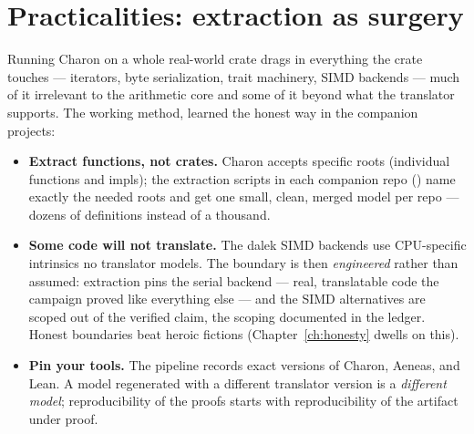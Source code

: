 \section{Practicalities: extraction as surgery}

Running Charon on a whole real-world crate drags in everything the crate
touches --- iterators, byte serialization, trait machinery, SIMD backends
--- much of it irrelevant to the arithmetic core and some of it beyond what
the translator supports. The working method, learned the honest way in the
companion projects:

\begin{itemize}[leftmargin=1.4em]
\item \textbf{Extract functions, not crates.} Charon accepts specific roots
  (individual functions and impls); the extraction scripts in each companion
  repo () name exactly the needed roots and get one
  small, clean, merged model per repo --- dozens of definitions instead
  of a thousand.
\item \textbf{Some code will not translate.} The dalek SIMD backends use
  CPU-specific intrinsics no translator models. The boundary is then
  \emph{engineered} rather than assumed: extraction pins the serial
  backend --- real, translatable code the campaign proved like everything
  else --- and the SIMD alternatives are scoped out of the verified
  claim, the scoping documented in the ledger. Honest boundaries beat
  heroic fictions (Chapter~\ref{ch:honesty} dwells on this).
\item \textbf{Pin your tools.} The pipeline records exact versions of
  Charon, Aeneas, and Lean. A model regenerated with a different translator
  version is a \emph{different model}; reproducibility of the proofs starts
  with reproducibility of the artifact under proof.
\end{itemize}


